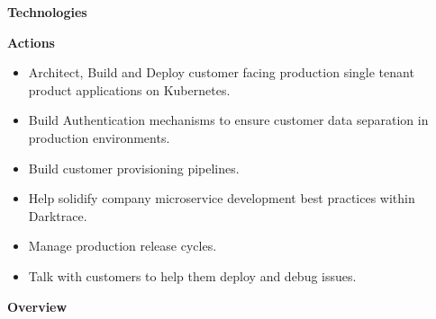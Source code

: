 \documentclass[10pt,a4paper]{altacv}
\begin{document}
\textbf{Technologies}


\divider

\textbf{Actions}

\begin{itemize}
\item Architect, Build and Deploy customer facing production single tenant product applications on Kubernetes.
\item Build Authentication mechanisms to ensure customer data separation in production environments.
\item Build customer provisioning pipelines.
\item Help solidify company microservice development best practices within Darktrace.
\item Manage production release cycles.
\item Talk with customers to help them deploy and debug issues.
\end{itemize}

\divider
  
\divider
\textbf{Overview}
\end{document}
